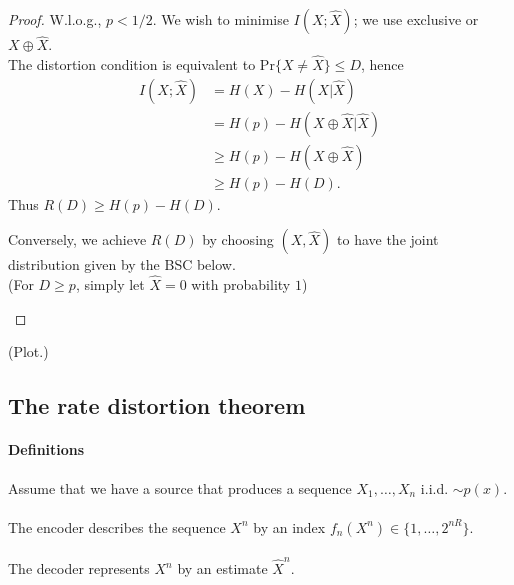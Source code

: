 \documentclass[a4paper, 11pt, openany]{book}
\begin{document}
\begin{proof}
W.l.o.g., $p < 1/2$. We wish to minimise $I(X;\hat{X})$; we use exclusive or $X \oplus \hat{X}$.\\
The distortion condition is equivalent to $\mathrm{Pr}\{X \ne \hat{X}\} \le D$, hence
\begin{align*}
	I(X; \hat{X}) &= H(X) - H(X | \hat{X})\\
	&= H(p) - H(X \oplus \hat{X} | \hat{X})\\
	&\ge H(p) - H(X \oplus \hat{X})\\
	&\ge H(p) - H(D).
\end{align*}
Thus $R(D) \ge H(p) - H(D)$.


Conversely, we achieve $R(D)$ by choosing $(X, \hat{X})$ to have the joint distribution given by the BSC below.\\
(For $D \ge p$, simply let $\hat{X} = 0$ with probability $1$)

\begin{figure}
\centering
{}
\end{figure}


\end{proof}

(Plot.)

\subsection{The rate distortion theorem}



\paragraph{Definitions}
Assume that we have a source that produces a sequence $X_1,\ldots,X_n$ i.i.d. $\sim p(x)$.\\
~\\
The encoder describes the sequence $X^n$ by an index $f_n(X^n) \in \{1,\ldots,2^{nR}\}$.\\
~\\
The decoder represents $X^n$ by an estimate $\hat{X}^n$.
\end{document}
